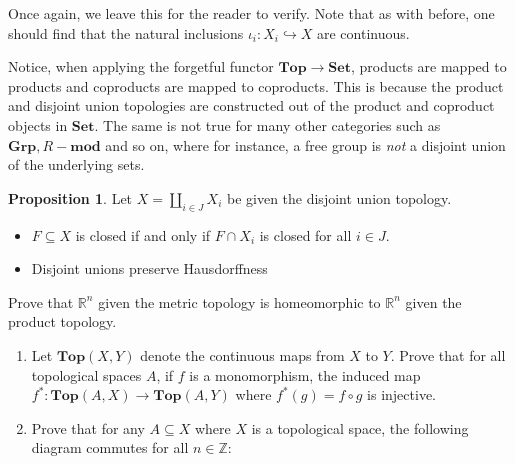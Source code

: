 \documentclass[12pt,reqno]{amsart}
\numberwithin{theorem}{section}
\theoremstyle{definition}
\theoremstyle{remark}
\numberwithin{equation}{section}
\theoremstyle{definition}
\newtheorem{prop}[theorem]{Proposition}
\begin{document}
Once again, we leave this for the reader to verify. Note that as with before, one should find that the natural inclusions $\iota_{i}:X_i \hookrightarrow X$ are continuous.
\begin{remark}
Notice, when applying the forgetful functor $\mathbf{Top} \rightarrow \mathbf{Set}$, products are mapped to products and coproducts are mapped to coproducts. This is because the product and disjoint union topologies are constructed out of the product and coproduct objects in $\mathbf{Set}$. The same is not true for many other categories such as $\mathbf{Grp},R-\mathbf{mod}$ and so on, where for instance, a free group is \textit{not} a disjoint union of the underlying sets.
\end{remark}
\begin{prop}
    Let $X=\coprod_{i \in J} X_i$ be given the disjoint union topology.
    \begin{itemize}
        \item $F\subseteq X$ is closed if and only if $F\cap X_i$ is closed for all $i \in J$.
        \item Disjoint unions preserve Hausdorffness
    \end{itemize}
\end{prop}
\begin{exercise}
    Prove that $\mathbb R^n$ given the metric topology is homeomorphic to $\mathbb R^n$ given the product topology.
\end{exercise}
\begin{exercise}
\begin{enumerate}
\item Let $\mathbf{Top}(X,Y)$ denote the continuous maps from $X$ to $Y$. Prove that for all topological spaces $A$, if $f$ is a monomorphism, the induced map $f^* : \mathbf{Top}(A,X)\rightarrow \mathbf{Top}(A,Y)$ where $f^*(g) = f\circ g$ is injective.
\item
    Prove that for any $A\subseteq X$ where $X$ is a topological space, the following diagram commutes for all $n \in \mathbb Z$:
    \begin{center}
\end{center}
\end{enumerate}
\end{exercise}
\end{document}
